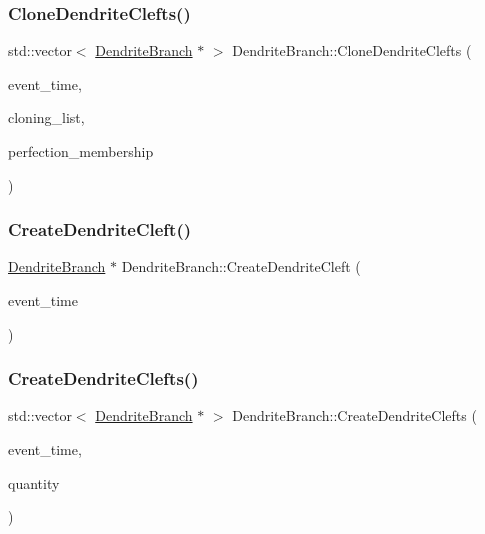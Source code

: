 \subsubsection{\texorpdfstring{Clone\+Dendrite\+Clefts()}{CloneDendriteClefts()}}
{\footnotesize\ttfamily std\+::vector$<$ \mbox{\hyperlink{classDendriteBranch}{Dendrite\+Branch}} $\ast$ $>$ Dendrite\+Branch\+::\+Clone\+Dendrite\+Clefts (\begin{DoxyParamCaption}\item[{std\+::chrono\+::time\+\_\+point$<$ \mbox{\hyperlink{universe_8h_a0ef8d951d1ca5ab3cfaf7ab4c7a6fd80}{Clock}} $>$}]{event\+\_\+time,  }\item[{std\+::vector$<$ \mbox{\hyperlink{classDendriteBranch}{Dendrite\+Branch}} $\ast$$>$}]{cloning\+\_\+list,  }\item[{double}]{perfection\+\_\+membership }\end{DoxyParamCaption})}

\mbox{\label{classDendriteBranch_a4f751442a537f2e3d7d0dc66a09bd84b}} 
\subsubsection{\texorpdfstring{Create\+Dendrite\+Cleft()}{CreateDendriteCleft()}}
{\footnotesize\ttfamily \mbox{\hyperlink{classDendriteBranch}{Dendrite\+Branch}} $\ast$ Dendrite\+Branch\+::\+Create\+Dendrite\+Cleft (\begin{DoxyParamCaption}\item[{std\+::chrono\+::time\+\_\+point$<$ \mbox{\hyperlink{universe_8h_a0ef8d951d1ca5ab3cfaf7ab4c7a6fd80}{Clock}} $>$}]{event\+\_\+time }\end{DoxyParamCaption})}

\mbox{\label{classDendriteBranch_a86d00d6ad66c8c83683e9e22d73a71b6}} 
\subsubsection{\texorpdfstring{Create\+Dendrite\+Clefts()}{CreateDendriteClefts()}}
{\footnotesize\ttfamily std\+::vector$<$ \mbox{\hyperlink{classDendriteBranch}{Dendrite\+Branch}} $\ast$ $>$ Dendrite\+Branch\+::\+Create\+Dendrite\+Clefts (\begin{DoxyParamCaption}\item[{std\+::chrono\+::time\+\_\+point$<$ \mbox{\hyperlink{universe_8h_a0ef8d951d1ca5ab3cfaf7ab4c7a6fd80}{Clock}} $>$}]{event\+\_\+time,  }\item[{int}]{quantity }\end{DoxyParamCaption})}

